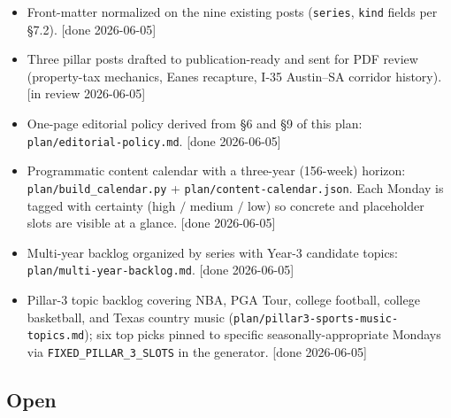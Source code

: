 \documentclass[11pt]{article}
\begin{document}
\begin{itemize}
\item Front-matter normalized on the nine existing posts
(\texttt{series}, \texttt{kind} fields per \S 7.2). [done 2026-06-05]

\item Three pillar posts drafted to publication-ready and sent for
PDF review (property-tax mechanics, Eanes recapture, I-35
Austin--SA corridor history). [in review 2026-06-05]

\item One-page editorial policy derived from \S 6 and \S 9 of this
plan: \texttt{plan/editorial-policy.md}. [done 2026-06-05]

\item Programmatic content calendar with a three-year (156-week)
horizon: \texttt{plan/build\_calendar.py} +
\texttt{plan/content-calendar.json}. Each Monday is tagged with
certainty (high $/$ medium $/$ low) so concrete and placeholder
slots are visible at a glance. [done 2026-06-05]

\item Multi-year backlog organized by series with Year-3 candidate
topics: \texttt{plan/multi-year-backlog.md}. [done 2026-06-05]

\item Pillar-3 topic backlog covering NBA, PGA Tour, college
football, college basketball, and Texas country music
(\texttt{plan/pillar3-sports-music-topics.md}); six top picks
pinned to specific seasonally-appropriate Mondays via
\texttt{FIXED\_PILLAR\_3\_SLOTS} in the generator. [done 2026-06-05]
\end{itemize}

\subsection{Open}
\end{document}
